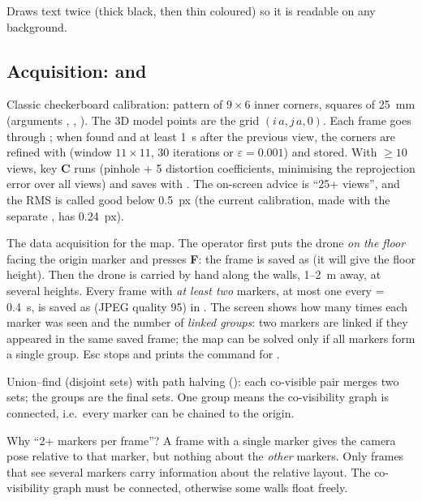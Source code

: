 Draws text twice (thick black, then thin coloured) so it is readable on any background.

\subsection{Acquisition:  and }

Classic checkerboard calibration: pattern of $9\times6$ inner corners, squares of 25~mm (arguments
, , ). The 3D model points are the grid $(i\,a, j\,a, 0)$. Each frame
goes through ; when found and at least 1~s after the previous view, the corners are
refined with  (window $11\times11$, 30 iterations or $\varepsilon = 0.001$) and stored. With
$\geq 10$ views, key \textbf{C} runs  (pinhole + 5 distortion coefficients, minimising
the reprojection error over all views) and saves with . The on-screen advice is ``25+ views'',
and the RMS is called good below 0.5~px (the current calibration, made with the separate
, has 0.24~px).

The data acquisition for the map. The operator first puts the drone \emph{on the floor} facing the origin marker
and presses \textbf{F}: the frame is saved as  (it will give the floor height). Then the drone
is carried by hand along the walls, 1--2~m away, at several heights. Every frame with \emph{at least two}
markers, at most one every  = 0.4~s, is saved as  (JPEG quality 95) in
. The screen shows how many times each marker was seen and the number of
\emph{linked groups}: two markers are linked if they appeared in the same saved frame; the map can be solved only
if all markers form a single group. Esc stops and prints the command for .

Union--find (disjoint sets) with path halving (): each co-visible pair
merges two sets; the groups are the final sets. One group means the co-visibility graph is connected, i.e.\ every
marker can be chained to the origin.

\begin{keypoint}
Why ``2+ markers per frame''? A frame with a single marker gives the camera pose relative to that marker, but
nothing about the \emph{other} markers. Only frames that see several markers carry information about the
relative layout. The co-visibility graph must be connected, otherwise some walls float freely.
\end{keypoint}

